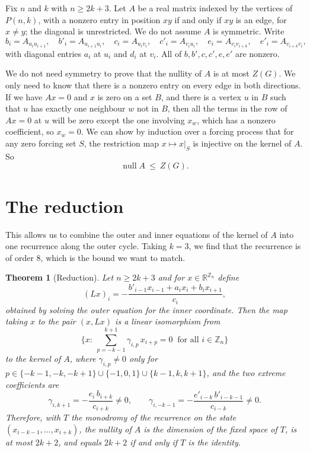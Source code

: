 \documentclass[11pt]{article}
\newtheorem{theorem}{Theorem}
\theoremstyle{definition}
\begin{document}
Fix $n$ and $k$ with $n\ge2k+3$. Let $A$ be a real matrix indexed by the
vertices of $P(n,k)$, with a nonzero entry in position $xy$ if and only if $xy$
is an edge, for $x\ne y$; the diagonal is unrestricted. We do not assume $A$ is
symmetric. Write
\[
  b_i=A_{u_iu_{i+1}},\quad b'_i=A_{u_{i+1}u_i},\quad
  c_i=A_{u_iv_i},\quad c'_i=A_{v_iu_i},\quad
  e_i=A_{v_iv_{i+k}},\quad e'_i=A_{v_{i+k}v_i},
\]
with diagonal entries $a_i$ at $u_i$ and $d_i$ at $v_i$. All of
$b,b',c,c',e,e'$ are nonzero.

We do not need symmetry to prove that the nullity of $A$ is at most $Z(G)$. We
only need to know that there is a nonzero entry on every edge in both
directions. If we have $Ax=0$ and $x$ is zero on a set $B$, and there is a
vertex $u$ in $B$ such that $u$ has exactly one neighbour $w$ not in $B$, then
all the terms in the row of $Ax=0$ at $u$ will be zero except the one involving
$x_w$, which has a nonzero coefficient, so $x_w=0$.
We can show by induction over a forcing process that for any zero forcing set
$S$, the restriction map $x\mapsto x|_S$ is injective on the kernel of $A$. So
\begin{equation}\label{eq:mz}
  \operatorname{null}A\ \le\ Z(G).
\end{equation}

\section{The reduction}\label{sec:red}

This allows us to combine the outer and inner equations of the kernel of $A$
into one recurrence along the outer cycle. Taking $k=3$, we find that the
recurrence is of order $8$, which is the bound we want to match.

\begin{theorem}[Reduction]\label{thm:red}
Let $n\ge2k+3$ and for $x\in\mathbb R^{\mathbb Z_n}$ define
\[
  (Lx)_i=-\frac{b'_{i-1}x_{i-1}+a_ix_i+b_ix_{i+1}}{c_i},
\]
obtained by solving the outer equation for the inner coordinate. Then the map
taking $x$ to the pair $(x,Lx)$ is a linear isomorphism from
\[
  \Big\{x:\ \textstyle\sum_{p=-k-1}^{k+1}\gamma_{i,p}\,x_{i+p}=0
  \ \text{ for all } i\in\mathbb Z_n\Big\}
\]
to the kernel of $A$, where $\gamma_{i,p}\ne0$ only for
$p\in\{-k-1,-k,-k+1\}\cup\{-1,0,1\}\cup\{k-1,k,k+1\}$, and the two extreme
coefficients are
\[
  \gamma_{i,k+1}=-\frac{e_i\,b_{i+k}}{c_{i+k}}\ne0,
  \qquad
  \gamma_{i,-k-1}=-\frac{e'_{i-k}\,b'_{i-k-1}}{c_{i-k}}\ne0 .
\]
Therefore, with $T$ the monodromy of the recurrence on the state
$(x_{i-k-1},\dots,x_{i+k})$, the nullity of $A$ is the dimension of the fixed
space of $T$, is at most $2k+2$, and equals $2k+2$ if and only if $T$ is the
identity.
\end{theorem}
\end{document}
